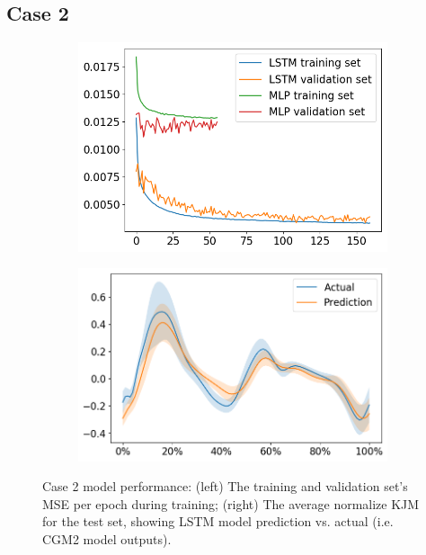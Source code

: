 \documentclass[../main.tex]{subfiles}
\begin{document}
\subsection{Case 2}
\label{sec:results-case2}

\begin{figure}[ht!]
     \centering
     \begin{subfigure}[b]{0.466\textwidth}
         \centering
         \includegraphics[width=\textwidth]{img/results/training_history/Case2_LSTMvsMLP_training.png}
     \end{subfigure}
     \hfill
     \begin{subfigure}[b]{0.524\textwidth}
         \centering
         \includegraphics[width=\textwidth]{img/results/test_prediction_evaluation/Case2_LSTM_test_prediction.png}
     \end{subfigure}
    \caption{Case 2 model performance: (left) The training and validation set's \ac{MSE} per epoch during training; (right) The average normalize \ac{KJM} for the test set, showing \ac{LSTM} model prediction vs. actual (i.e. CGM2 model outputs).}
    \label{fig:case2-performance-plots}
\end{figure}
\end{document}
